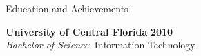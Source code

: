 \documentclass{resume} %
\begin{document}

\begin{rSection}{Education and Achievements}

{\bf University of Central Florida} \hfill {\bf 2010} \\ 
{\it Bachelor of Science}: Information Technology \\
\end{rSection}
\end{document}
